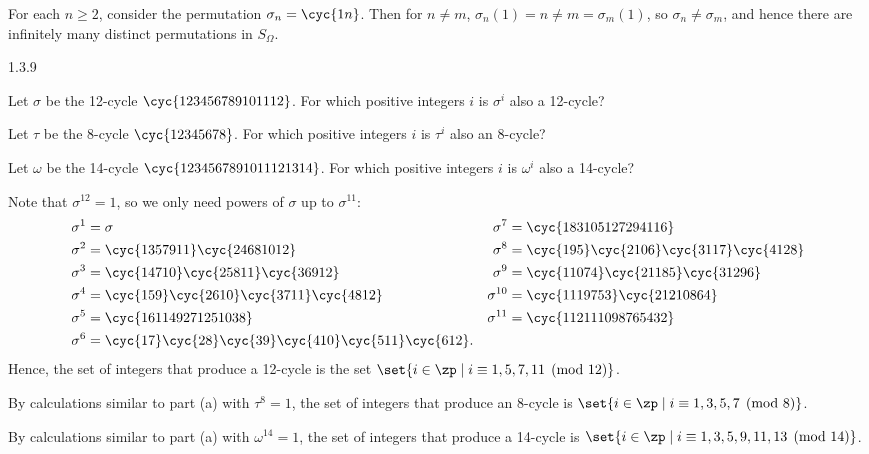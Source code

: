 \begin{sol}
    For each $n \geq 2$, consider the permutation $\sigma_n = \cyc{1 n}$.
	Then for $n \neq m$, $\sigma_n(1) = n \neq m = \sigma_m(1)$, so $\sigma_n \neq \sigma_m$, and hence there are infinitely many distinct permutations in $S_\Omega$.
\end{sol}

\begin{exercise}{1.3.9}
    \begin{subexercises}
        \item Let $\sigma$ be the 12-cycle $\cyc{1 2 3 4 5 6 7 8 9 10 11 12}$.
        For which positive integers $i$ is $\sigma^i$ also a 12-cycle?
        \item Let $\tau$ be the 8-cycle $\cyc{1 2 3 4 5 6 7 8}$.
        For which positive integers $i$ is $\tau^i$ also an 8-cycle?
        \item Let $\omega$ be the 14-cycle $\cyc{1 2 3 4 5 6 7 8 9 10 11 12 13 14}$.
        For which positive integers $i$ is $\omega^i$ also a 14-cycle?
    \end{subexercises}
\end{exercise}

\begin{solenum}
    \item Note that $\sigma^{12} = 1$, so we only need powers of $\sigma$ up to $\sigma^{11}$:
    \begin{align*}
        \sigma^1 & = \sigma & \sigma^7 & = \cyc{1 8 3 10 5 12 7 2 9 4 11 6} \\
        \sigma^2 & = \cyc{1 3 5 7 9 11}\cyc{2 4 6 8 10 12} & \sigma^8 & = \cyc{1 9 5}\cyc{2 10 6}\cyc{3 11 7}\cyc{4 12 8} \\
        \sigma^3 & = \cyc{1 4 7 10}\cyc{2 5 8 11}\cyc{3 6 9 12} & \sigma^9 & = \cyc{1 10 7 4}\cyc{2 11 8 5}\cyc{3 12 9 6} \\
        \sigma^4 & = \cyc{1 5 9}\cyc{2 6 10}\cyc{3 7 11}\cyc{4 8 12} & \sigma^{10} & = \cyc{1 11 9 7 5 3}\cyc{2 12 10 8 6 4} \\
        \sigma^5 & = \cyc{1 6 11 4 9 2 7 12 5 10 3 8} & \sigma^{11} & = \cyc{1 12 11 10 9 8 7 6 5 4 3 2} \\
        \sigma^6 & = \cyc{1 7}\cyc{2 8}\cyc{3 9}\cyc{4 10}\cyc{5 11}\cyc{6 12}.
    \end{align*}
    Hence, the set of integers that produce a 12-cycle is the set $\set{i \in \zp \mid i \equiv 1, 5, 7, 11 \pmod{12}}$.
    \item By calculations similar to part (a) with $\tau^8 = 1$, the set of integers that produce an 8-cycle is $\set{i \in \zp \mid i \equiv 1, 3, 5, 7 \pmod{8}}$.
    \item By calculations similar to part (a) with $\omega^{14} = 1$, the set of integers that produce a 14-cycle is $\set{i \in \zp \mid i \equiv 1, 3, 5, 9, 11, 13 \pmod{14}}$. \qedhere
\end{solenum}

